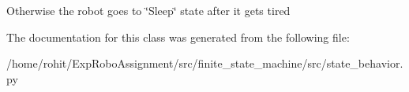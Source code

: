 Otherwise the robot goes to \char`\"{}\+Sleep\char`\"{} state after it gets tired 

The documentation for this class was generated from the following file\+:\begin{DoxyCompactItemize}
\item 
/home/rohit/\+Exp\+Robo\+Assignment/src/finite\+\_\+state\+\_\+machine/src/state\+\_\+behavior.\+py\end{DoxyCompactItemize}
